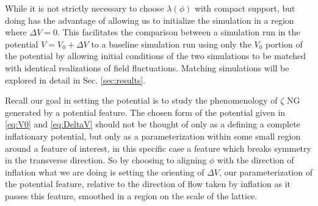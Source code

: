 While it is not strictly necessary to choose $\lambda(\phi)$ with compact support, but doing has the advantage of allowing us to initialize the simulation in a region where $\Delta V=0$. %
This facilitates the comparison between a simulation run in the potential $V=V_0+\Delta V$ to a baseline simulation run using only the $V_0$ portion of the potential by allowing initial conditions of the two simulations to be matched with identical realizations of field fluctuations. Matching simulations will be explored in detail in Sec. \ref{sec:results}.

Recall our goal in setting the potential is to study the phenomenology of $\zeta$ NG generated by a potential feature. The chosen form of the potential given in \eqref{eq:V0} and \eqref{eq:DeltaV} should not be thought of only as a defining a complete inflationary potential, but only as a parameterization within some small region around a feature of interest, in this specific case a feature which breaks symmetry in the transverse direction. So by choosing to aligning $\phi$ with the direction of inflation what we are doing is setting the orienting of $\Delta V$, our parameterization of the potential feature, relative to the direction of flow taken by inflation as it passes this feature, smoothed in a region on the scale of the lattice. %


